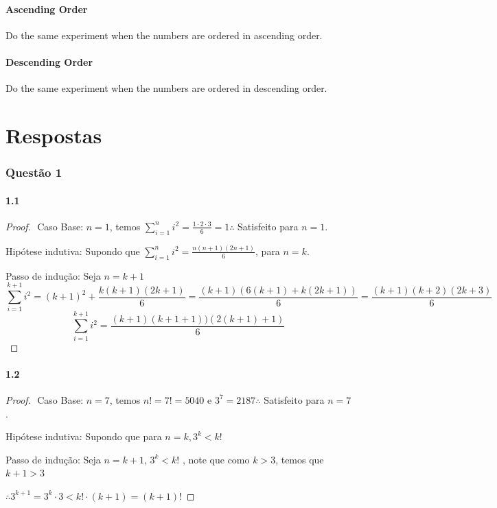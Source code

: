 \documentclass{article}
\begin{document}
\subsection{Ascending Order}
Do the same experiment when the numbers are ordered in ascending order.

\subsection{Descending Order}
Do the same experiment when the numbers are ordered in descending order.

\pagebreak
\part*{Respostas}

\section*{Questão 1}
\subsection*{1.1}
\begin{proof}
$ $\newline
Caso Base: $n = 1$, temos $\sum^{n}_{i=1}{i^2}= \frac{1\cdot2\cdot3}{6}=1 \therefore$ Satisfeito para $n = 1$.

Hipótese indutiva: Supondo que $\sum^{n}_{i=1}{i^2} =\frac{n(n+1)(2n+1)}{6}$, para $n = k$.

Passo de indução: Seja $n = k + 1$
$$\sum^{k+1}_{i=1}{i^2} = (k+1)^2 + \frac{k(k+1)(2k+1)}{6} =
\frac{(k+1)(6(k+1) + k(2k + 1))}{6} = \frac{(k+1)(k+2)(2k +3)}{6} 
$$
$$
\sum^{k+1}_{i=1}{i^2} = \frac{(k+1)(k+1+1))(2(k+1)+1)}{6}
$$
\end{proof}

\subsection*{1.2}
\begin{proof}
$ $\newline
Caso Base: $n = 7$, temos $n! = 7! = 5040$ e $3^7 = 2187 \therefore$ Satisfeito para $n = 7$.

Hipótese indutiva: Supondo que para $n=k, 3^k < k!$

Passo de indução: Seja $n = k + 1$, $3^k < k!$
, note que como $k>3$, temos que $k+1>3$

$\therefore 3^{k+1}=3^k\cdot3 < k!\cdot(k+1)=(k+1)!$

\end{proof}
\end{document}
